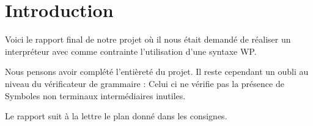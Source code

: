 \chapter*{Introduction}
	Voici le rapport final de notre projet où il nous était demandé de
	réaliser un interpréteur avec comme contrainte l'utilisation d'une
	syntaxe WP. 

	Nous pensons avoir complété l'entièreté du projet. Il reste cependant
	un oubli au niveau du vérificateur de grammaire : Celui ci ne vérifie
	pas la présence de Symboles non terminaux intermédiaires inutiles. 

	Le rapport suit à la lettre le plan donné dans les consignes. 

